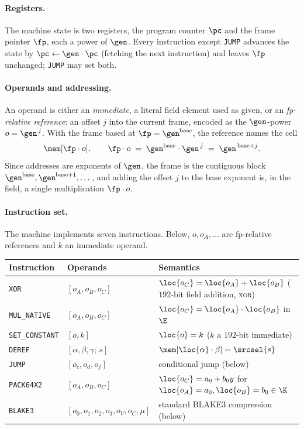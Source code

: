 \paragraph{Registers.} The machine state is two registers, the program counter $\pc$ and the frame pointer $\fp$, each a power of $\gen$. Every instruction except \texttt{JUMP} advances the state by $\pc\gets\gen\cdot\pc$ (fetching the next instruction) and leaves $\fp$ unchanged; \texttt{JUMP} may set both.

\paragraph{Operands and addressing.} An operand is either an \emph{immediate}, a literal field element used as given, or an \emph{fp-relative reference}: an offset $j$ into the current frame, encoded as the $\gen$-power $o=\gen^{\,j}$. With the frame based at $\fp=\gen^{\mathrm{base}}$, the reference names the cell
\[
  \mem[\fp\cdot o],\qquad \fp\cdot o\;=\;\gen^{\mathrm{base}}\cdot\gen^{\,j}\;=\;\gen^{\,\mathrm{base}+j}.
\]
Since addresses are exponents of $\gen$, the frame is the contiguous block $\gen^{\mathrm{base}},\gen^{\mathrm{base}+1},\dots$, and adding the offset $j$ to the base exponent is, in the field, a single multiplication $\fp\cdot o$.

\paragraph{Instruction set.} The machine implements seven instructions. Below, $o,o_A,\dots$ are fp-relative references and $k$ an immediate operand.
\begin{center}
\begin{tabularx}{\textwidth}{@{}llX@{}}
\hline
Instruction & Operands & Semantics\\
\hline
\texttt{XOR}           & $[o_A,o_B,o_C]$ & $\loc{o_C}=\loc{o_A}+\loc{o_B}$ \quad($192$-bit field addition, \textsc{xor})\\
\texttt{MUL\_NATIVE}   & $[o_A,o_B,o_C]$ & $\loc{o_C}=\loc{o_A}\cdot\loc{o_B}$ in $\E$\\
\texttt{SET\_CONSTANT} & $[o,k]$         & $\loc{o}=k$ \quad($k$ a $192$-bit immediate)\\
\texttt{DEREF}         & $[\alpha,\beta,\gamma;\,s]$ & $\mem[\loc{\alpha}\cdot\beta]=\srcsel{s}$\\
\texttt{JUMP}          & $[o_c,o_d,o_f]$ & conditional jump (below)\\
\texttt{PACK64X2}      & $[o_A,o_B,o_C]$ & $\loc{o_C}=a_0+b_0y$ for $\loc{o_A}=a_0,\loc{o_B}=b_0\in\K$\\
\texttt{BLAKE3}        & $[o_0,o_1,o_2,o_3,o_V,o_C,\mu]$ & standard BLAKE3 compression (below)\\
\hline
\end{tabularx}
\end{center}

